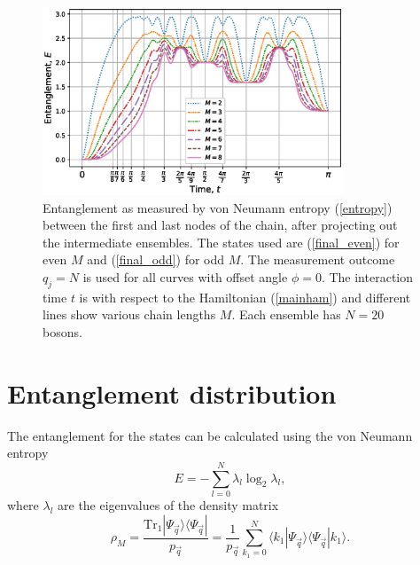 \documentclass[12pt]{iopart}
\begin{document}

\begin{figure}[ht]
    \centering
    \includegraphics[width=0.8\textwidth]{entanglement}
    \caption{Entanglement as measured by von Neumann entropy (\ref{entropy})  between the first and last nodes of the chain, after projecting out the intermediate ensembles. The states used are (\ref{final_even}) for even $ M $ and (\ref{final_odd}) for odd $ M $.  The measurement outcome $ q_j = N $ is used for all curves with offset angle $ \phi = 0 $.  The interaction time $ t $ is with respect to the Hamiltonian (\ref{mainham}) and different lines show various chain lengths $ M $. Each ensemble has $ N = 20 $ bosons. }
    \label{fig:entanglement}
\end{figure}




\section{Entanglement distribution}


The entanglement for the states can be calculated using the von Neumann entropy
%
\begin{equation}
E=-\sum^{N}_{l=0} \lambda_l \log_2 \lambda_l ,
\label{entropy}
\end{equation}
%
where $\lambda_l$ are the eigenvalues of the density matrix
%
\begin{equation}
\rho_M = \frac{\mathrm{Tr}_1  |\Psi_{\vec{q}} \rangle\langle\Psi_{\vec{q}} |}{p_{\vec{q}}} =
\frac{1}{p_{\vec{q}}} \sum^N_{k_1=0} \langle k_1|\Psi_{\vec{q}} \rangle\langle \Psi_{\vec{q}} |k_1\rangle . 
\label{rhom}
\end{equation}
\end{document}
